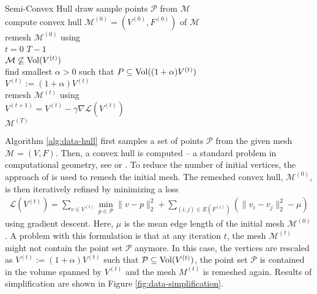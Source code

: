 \begin{algorithm}[t]
  \small
	\begin{algo}{Semi-Convex Hull}{
	\label{alg:data-hull}
	}
	  draw sample points $\mathcal{P}$ from $\mathcal{M}$\\
	  compute convex hull $\mathcal{M}^{(0)} = (V^{(0)}, F^{(0)})$ of $\mathcal{M}$\\
	  remesh $\mathcal{M}^{(0)}$ using \cite{FuhrmannAckermannGoesele:2010}\\
		\qfor $t = 0$ \qto $T - 1$\\
		  \qif $\mathcal{M} \not\subseteq \mathrm{Vol}(V^{(t)})$\\
		    \qthen find smallest $\alpha > 0$ such that $P \subseteq \mathrm{Vol}((1 + \alpha)V^{(t)})$\\
		    $V^{(t)} := (1 + \alpha) V^{(t)}$\\
		    remesh $\mathcal{M}^{(t)}$ using \cite{FuhrmannAckermannGoesele:2010}\qfi\\
		  $V^{(t + 1)} = V^{(t)} - \gamma \nabla \mathcal{L}(V^{(t)})$\qrof\\
		\qreturn $\mathcal{M}^{(T)}$
	\end{algo}
	\caption{The semi-convex hull algorithm used in \cite{GueneyGeiger:2015}
	to obtain watertight, simplified meshes. Details can be found in the text.}
\end{algorithm}

Algorithm \ref{alg:data-hull} first samples a set of points $\mathcal{P}$ from the
given mesh $\mathcal{M} = (V, F)$. Then, a convex hull is computed -- 
a standard problem in computational geometry, see
\cite{Cormen:2009} or \cite{DeBergCheongVanKreveldOvermars:2008}.
To reduce the number of initial vertices, the approach of
\cite{FuhrmannAckermannGoesele:2010} is used to remesh the
initial mesh. The remeshed convex hull, $\mathcal{M}^{(0)}$,  is then
iteratively refined by minimizing a loss
\begin{align}
  \mathcal{L}(V^{(t)}) = \sum_{v \in V^{(t)}} \min_{p \in \mathcal{P}} \|v - p\|_2^2 + \sum_{(i, j) \in E(F^{(t)})}\left(\|v_i - v_j\|_2^2 - \mu\right)
\end{align}
using gradient descent. Here, $\mu$ is the mean edge length
of the initial mesh $\mathcal{M}^{(0)}$. A problem with this formulation is
that at any iteration $t$, the mesh $\mathcal{M}^{(t)}$ might not
contain the point set $\mathcal{P}$ anymore. In this case,
the vertices are rescaled as $V^{(t)} := (1 + \alpha)V^{(t)}$ such that
$\mathcal{P} \subseteq \mathrm{Vol}(V^{(t)})$, \ie the point set
$\mathcal{P}$ is contained in the volume spanned by $V^{(t)}$
and the mesh $M^{(t)}$ is remeshed again. Results of simplification
are shown in Figure \ref{fig:data-simplification}.

